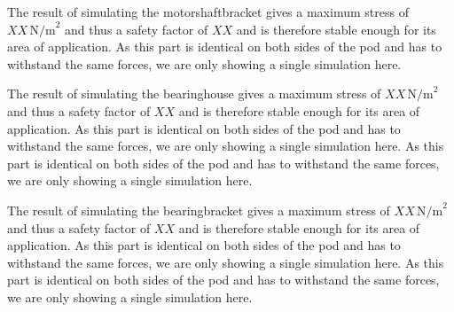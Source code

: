 
The result of simulating the motorshaftbracket gives a maximum stress of \(XX \, \text{N/m}^2\) and thus a safety factor of \(XX\) and is therefore stable enough for its area of application. As this part is identical on both sides of the pod and has to withstand the same forces, we are only showing a single simulation here.


The result of simulating the bearinghouse gives a maximum stress of \(XX \, \text{N/m}^2\) and thus a safety factor of \(XX\) and is therefore stable enough for its area of application. As this part is identical on both sides of the pod and has to withstand the same forces, we are only showing a single simulation here. As this part is identical on both sides of the pod and has to withstand the same forces, we are only showing a single simulation here.


The result of simulating the bearingbracket gives a maximum stress of \(XX \, \text{N/m}^2\) and thus a safety factor of \(XX\) and is therefore stable enough for its area of application. As this part is identical on both sides of the pod and has to withstand the same forces, we are only showing a single simulation here. As this part is identical on both sides of the pod and has to withstand the same forces, we are only showing a single simulation here.


